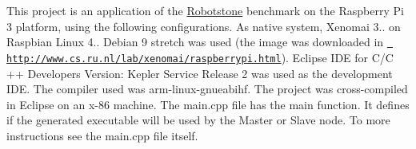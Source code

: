 \label{index_md_Intro}%
%
This project is an application of the \mbox{\hyperlink{class_robotstone}{Robotstone}} benchmark on the Raspberry Pi 3 platform, using the following configurations. As native system, Xenomai 3.. on Raspbian Linux 4.. Debian 9 stretch was used (the image was downloaded in \href{http://www.cs.ru.nl/lab/xenomai/raspberrypi.html}{\texttt{ http\+://www.\+cs.\+ru.\+nl/lab/xenomai/raspberrypi.\+html}}). Eclipse I\+DE for C/C ++ Developers Version\+: Kepler Service Release 2 was used as the development I\+DE. The compiler used was arm-\/linux-\/gnueabihf. The project was cross-\/compiled in Eclipse on an x-\/86 machine. The main.\+cpp file has the main function. It defines if the generated executable will be used by the Master or Slave node. To more instructions see the main.\+cpp file itself. 